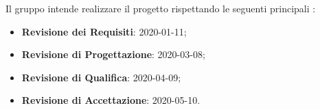 Il gruppo \Gruppo{} intende realizzare il progetto \NomeProgetto{} rispettando le seguenti principali :
\begin{itemize}
    \item \textbf{Revisione dei Requisiti}: 2020-01-11;
    \item \textbf{Revisione di Progettazione}: 2020-03-08;
    \item \textbf{Revisione di Qualifica}: 2020-04-09;
    \item \textbf{Revisione di Accettazione}: 2020-05-10.
\end{itemize}